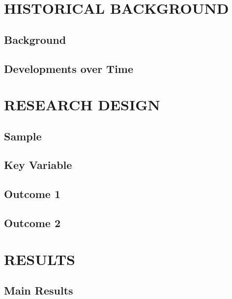 \documentclass[12pt]{article}
\begin{document}
\section{HISTORICAL BACKGROUND}


\subsection{Background}
\label{sec:background}


\subsection{Developments over Time}
\label{sec:developments}


\section{RESEARCH DESIGN}


\subsection{Sample}
\label{sec:sample}


\subsection{Key Variable}
\label{sec:key-variable}


\subsection{Outcome 1}
\label{sec:outcome-1}


\subsection{Outcome 2}
\label{sec:outcome-2}


\section{RESULTS}


\subsection{Main Results}
\label{sec:main-results}

\end{document}
